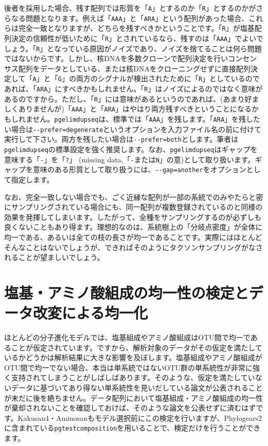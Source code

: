 \documentclass[titlepage,10pt,a4paper]{jsbook}
\begin{document}
後者を採用した場合、残す配列では形質を「\texttt{A}」とするのか「\texttt{R}」とするのかがさらなる問題となります。例えば「\texttt{AAA}」と「\texttt{ARA}」という配列があった場合、これらは完全一致となりますが、どちらを残すべきかということです。「\texttt{R}」が塩基配列決定の信頼性が低いために「\texttt{R}」とされているなら、残すのは「\texttt{AAA}」でよいでしょう。「\texttt{R}」となっている原因がノイズであり、ノイズを捨てることは何ら問題ではないからです。しかし、核DNAを多数クローンで配列決定を行いコンセンサス配列をデータとしている、または核DNAをクローニングせずに直接配列決定して「\texttt{A}」と「\texttt{G}」の両方のシグナルが検出されたために「\texttt{R}」としているのであれば、「\texttt{ARA}」にすべきかもしれません。「\texttt{R}」はノイズによるのではなく意味があるのですから。ただし、「\texttt{R}」には意味があるというのであれば、(あまり好ましくありませんが)「\texttt{AAA}」と「\texttt{ARA}」はやはり両方残すべきということになるかもしれません。\texttt{pgelimdupseq}は、標準では「\texttt{AAA}」を残します。「\texttt{ARA}」を残したい場合は\texttt{{-}{-}prefer=degenerate}というオプションを入力ファイル名の前に付けて実行して下さい。両方を残したい場合は\texttt{{-}{-}prefer=both}とします。筆者は\texttt{pgelimdupseq}の標準設定を強く推奨します。なお、\texttt{pgelimdupseq}はギャップを意味する「\texttt{-}」を「\texttt{?}」 (missing data,「\texttt{-}または\texttt{N}」の意)として取り扱います。ギャップを意味のある形質として取り扱うには、\texttt{{-}{-}gap=another}をオプションとして指定します。

なお、完全一致しない場合でも、ごく近縁な配列が一部の系統でのみやたらと密にサンプリングされている場合にも、同一配列が複数登録されているのと同様の効果を発揮してしまいます。したがって、全種をサンプリングするのが必ずしも良くないこともあり得ます。理想的なのは、系統樹上の「分岐点密度」が全体に均一である、あるいは全ての枝の長さが均一であることです。実際にはほとんどそんなことはないでしょうが、できればそのようにタクソンサンプリングがなされることが望ましいでしょう。

\section{塩基・アミノ酸組成の均一性の検定とデータ改変による均一化}

ほとんどの分子進化モデルでは、塩基組成やアミノ酸組成はOTU間で均一であることが仮定されています。ですから、解析対象のデータがその仮定を満たしているかどうかは解析結果に大きな影響を及ぼします。塩基組成やアミノ酸組成がOTU間で均一でない場合、本当は単系統ではないOTU群の単系統性が非常に強く支持されてしまうことがしばしばあります。そのような、仮定を満たしていないデータに基づいてあり得ない単系統性を見いだしている論文が公表されることが未だに後を絶ちません。データ配列において塩基組成・アミノ酸組成の均一性が棄却されないことを確認しておけば、そのような論文を公表せずに済むはずです。Kakusan4・Aminosanもモデル選択前にこの検定を行いますが、Phylogears2に含まれている\texttt{pgtestcomposition}を用いることで、検定だけを行うことができます。
\end{document}
